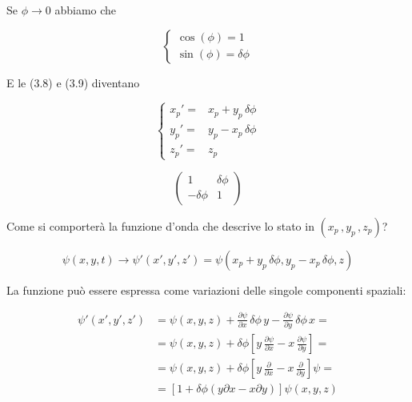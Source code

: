 Se $\phi \rightarrow 0$ abbiamo che

\begin{equation}
\left\{\begin{array}{ccc}

\cos(\phi) = 1 \\ 
\sin(\phi) = \delta \phi

\end{array}\right. 
\end{equation}


E le (3.8) e (3.9) diventano

\begin{equation}
\left\{\begin{array}{ccc}

x_p'={}& x_p + y_p \, \delta  \phi \\ 
y_p' =& y_p - x_p \, \delta  \phi \\
z_p' =& z_p \qquad \quad

\end{array}\right. 
\end{equation}

\begin{equation}
\left(
\begin{array}{ccc}

1 & \delta \phi \\
-\delta \phi & 1 

\end{array}  
\right)
\end{equation}

Come si comporterà la funzione d'onda che descrive lo stato in $(x_p \, , y_p\, , z_p)$?

\begin{equation}
\psi(x,y,t) \rightarrow \psi'(x',y',z')= \psi(x_p + y_p \, \delta  \phi , y_p - x_p \, \delta  \phi, z)
\end{equation}

La funzione può essere espressa come variazioni delle singole componenti spaziali:


\begin{equation}
\begin{split}
\psi'(x',y',z'){}&= \psi(x,y,z) + \frac{\partial \psi}{\partial x} \, \delta \phi \, y - \frac{\partial \psi}{\partial y}\, \delta \phi \, x = \\
&= \psi(x,y,z) +  \delta \phi \left[ y \, \frac{\partial \psi}{\partial x}   - x \, \frac{\partial \psi}{\partial y} \right] = \\
&= \psi(x,y,z) +  \delta \phi \left[ y \, \frac{\partial }{\partial x}  - x \, \frac{\partial }{\partial y} \right]\psi = \\
&= \left[ 1 + \delta \phi \left( y \partial x - x \partial y \right)  \right]\psi(x,y,z)
\end{split}
\end{equation}

